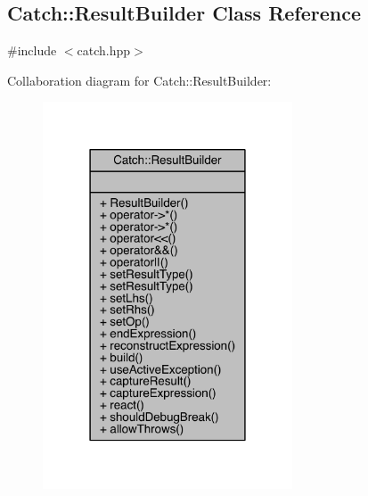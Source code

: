 \hypertarget{a00067}{}\subsection{Catch\+:\+:Result\+Builder Class Reference}
\label{a00067}


{\ttfamily \#include $<$catch.\+hpp$>$}



Collaboration diagram for Catch\+:\+:Result\+Builder\+:\nopagebreak
\begin{figure}[H]
\begin{center}
\leavevmode
\includegraphics[width=210pt]{a00251}
\end{center}
\end{figure}
